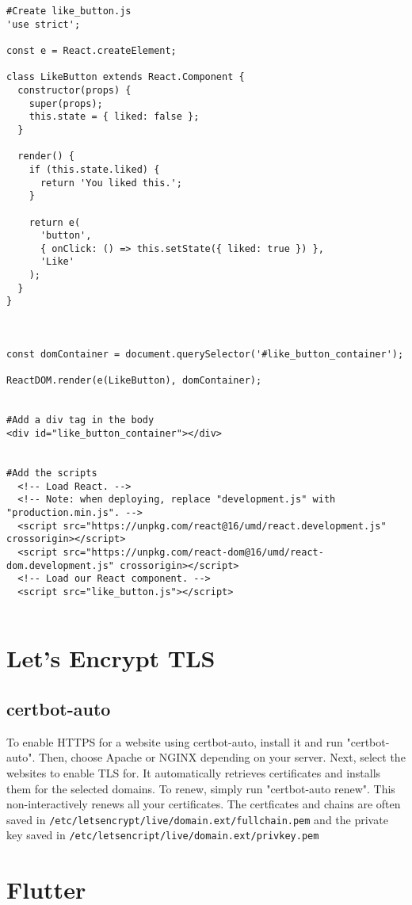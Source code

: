 \documentclass{article}
\begin{document}
\begin{verbatim}
#Create like_button.js
'use strict';

const e = React.createElement;

class LikeButton extends React.Component {
  constructor(props) {
    super(props);
    this.state = { liked: false };
  }

  render() {
    if (this.state.liked) {
      return 'You liked this.';
    }

    return e(
      'button',
      { onClick: () => this.setState({ liked: true }) },
      'Like'
    );
  }
}



const domContainer = document.querySelector('#like_button_container');

ReactDOM.render(e(LikeButton), domContainer);


#Add a div tag in the body
<div id="like_button_container"></div>


#Add the scripts 
  <!-- Load React. -->
  <!-- Note: when deploying, replace "development.js" with "production.min.js". -->
  <script src="https://unpkg.com/react@16/umd/react.development.js" crossorigin></script>  
  <script src="https://unpkg.com/react-dom@16/umd/react-dom.development.js" crossorigin></script>
  <!-- Load our React component. -->
  <script src="like_button.js"></script>
  
\end{verbatim}


\section{Let's Encrypt TLS}
\subsection{certbot-auto}
To enable HTTPS for a website using certbot-auto, install it and run "certbot-auto". Then, choose Apache or NGINX depending on your server. Next, select the websites to enable TLS for. It automatically retrieves certificates and installs them for the selected domains. To renew, simply run "certbot-auto renew". This non-interactively renews all your certificates. The certficates and chains are often saved in \lstinline{/etc/letsencrypt/live/domain.ext/fullchain.pem} and the private key saved in \lstinline{/etc/letsencript/live/domain.ext/privkey.pem}


\section{Flutter}
\end{document}
